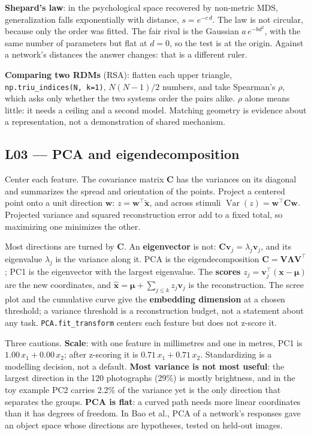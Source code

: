 \documentclass[11pt]{article}
\begin{document}
\textbf{Shepard's law}: in the psychological space recovered by non-metric MDS,
generalization falls exponentially with distance, $s = e^{-c\,d}$. The law is
not circular, because only the order was fitted. The fair rival is the Gaussian
$a\,e^{-bd^2}$, with the same number of parameters but flat at $d=0$, so the
test is at the origin. Against a network's distances the answer changes: that
is a different ruler.

\textbf{Comparing two RDMs} (RSA): flatten each upper triangle,
\texttt{np.triu\_indices(N, k=1)}, $N(N-1)/2$ numbers, and take Spearman's
$\rho$, which asks only whether the two systems order the pairs alike. $\rho$
alone means little: it needs a ceiling and a second model. Matching geometry is
evidence about a representation, not a demonstration of shared mechanism.

\subsection{L03 --- PCA and eigendecomposition}

Center each feature. The covariance matrix $\mathbf{C}$ has the variances on its
diagonal and summarizes the spread and orientation of the points. Project a
centered point onto a unit direction $\mathbf{w}$: $z=\mathbf{w}^\top\tilde{\mathbf{x}}$,
and across stimuli $\operatorname{Var}(z)=\mathbf{w}^\top\mathbf{C}\mathbf{w}$.
Projected variance and squared reconstruction error add to a fixed total, so
maximizing one minimizes the other.

Most directions are turned by $\mathbf{C}$. An \textbf{eigenvector} is not:
$\mathbf{C}\mathbf{v}_j=\lambda_j\mathbf{v}_j$, and its eigenvalue $\lambda_j$ is
the variance along it. PCA is the eigendecomposition
$\mathbf{C}=\mathbf{V}\boldsymbol{\Lambda}\mathbf{V}^\top$; PC1 is the eigenvector
with the largest eigenvalue. The \textbf{scores}
$z_j=\mathbf{v}_j^\top(\mathbf{x}-\boldsymbol{\mu})$ are the new coordinates, and
$\hat{\mathbf{x}}=\boldsymbol{\mu}+\sum_{j\le k}z_j\mathbf{v}_j$ is the
reconstruction. The scree plot and the cumulative curve give the
\textbf{embedding dimension} at a chosen threshold; a variance threshold is a
reconstruction budget, not a statement about any task. \texttt{PCA.fit\_transform}
centers each feature but does not z-score it.

Three cautions. \textbf{Scale}: with one feature in millimetres and one in
metres, PC1 is $1.00\,x_1+0.00\,x_2$; after z-scoring it is
$0.71\,x_1+0.71\,x_2$. Standardizing is a modelling decision, not a default.
\textbf{Most variance is not most useful}: the largest direction in the 120
photographs (29\%) is mostly brightness, and in the toy example PC2 carries 2.2\%
of the variance yet is the only direction that separates the groups.
\textbf{PCA is flat}: a curved path needs more linear coordinates than it has
degrees of freedom. In Bao et al., PCA of a network's responses gave an object
space whose directions are hypotheses, tested on held-out images.
\end{document}
